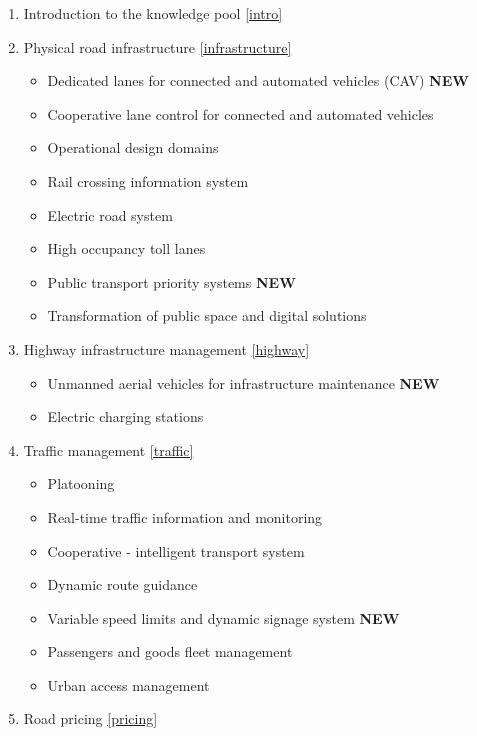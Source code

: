 \documentclass[
]{book}
\providecommand{\tightlist}{%
  \setlength{\itemsep}{0pt}\setlength{\parskip}{0pt}}
\begin{document}
\begin{enumerate}
\def\labelenumi{\arabic{enumi}.}
\tightlist
\item
  Introduction to the knowledge pool \ref{intro}
\item
  Physical road infrastructure \ref{infrastructure}

  \begin{itemize}
  \tightlist
  \item
    Dedicated lanes for connected and automated vehicles (CAV) \textbf{NEW}
  \item
    Cooperative lane control for connected and automated vehicles
  \item
    Operational design domains
  \item
    Rail crossing information system
  \item
    Electric road system
  \item
    High occupancy toll lanes
  \item
    Public transport priority systems \textbf{NEW}
  \item
    Transformation of public space and digital solutions
  \end{itemize}
\item
  Highway infrastructure management \ref{highway}

  \begin{itemize}
  \tightlist
  \item
    Unmanned aerial vehicles for infrastructure maintenance \textbf{NEW}
  \item
    Electric charging stations
  \end{itemize}
\item
  Traffic management \ref{traffic}

  \begin{itemize}
  \tightlist
  \item
    Platooning
  \item
    Real-time traffic information and monitoring
  \item
    Cooperative - intelligent transport system
  \item
    Dynamic route guidance
  \item
    Variable speed limits and dynamic signage system \textbf{NEW}
  \item
    Passengers and goods fleet management
  \item
    Urban access management
  \end{itemize}
\item
  Road pricing \ref{pricing}


\end{enumerate}
\end{document}
